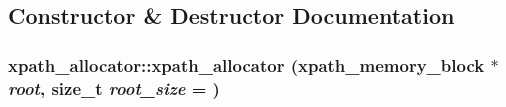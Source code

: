 \subsection{Constructor \& Destructor Documentation}
\hypertarget{classxpath__allocator_a3b8ba1722fba115d05949d8f592080e8}{
\subsubsection[{xpath\_\-allocator}]{\setlength{\rightskip}{0pt plus 5cm}xpath\_\-allocator::xpath\_\-allocator ({\bf xpath\_\-memory\_\-block} $\ast$ {\em root}, \/  size\_\-t {\em root\_\-size} = {})}}
\label{classxpath__allocator_a3b8ba1722fba115d05949d8f592080e8}


